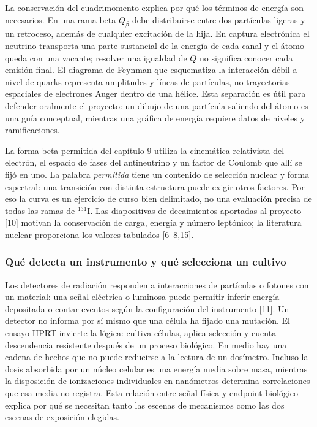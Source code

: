 \documentclass[11pt,a4paper,oneside]{article}
\begin{document}
La conservación del cuadrimomento explica por qué los términos de
energía son necesarios. En una rama beta $Q_\beta$ debe distribuirse
entre dos partículas ligeras y un retroceso, además de cualquier
excitación de la hija. En captura electrónica el neutrino transporta
una parte sustancial de la energía de cada canal y el átomo queda con
una vacante; resolver una igualdad de $Q$ no significa conocer cada
emisión final. El diagrama de Feynman que esquematiza la interacción
débil a nivel de quarks representa amplitudes y líneas de partículas,
no trayectorias espaciales de electrones Auger dentro de una hélice.
Esta separación es útil para defender oralmente el proyecto: un dibujo
de una partícula saliendo del átomo es una guía conceptual, mientras
una gráfica de energía requiere datos de niveles y ramificaciones.

La forma beta permitida del capítulo 9 utiliza la cinemática relativista
del electrón, el espacio de fases del antineutrino y un factor de Coulomb
que allí se fijó en uno. La palabra \emph{permitida} tiene un contenido
de selección nuclear y forma espectral: una transición con distinta
estructura puede exigir otros factores. Por eso la curva es un ejercicio
de curso bien delimitado, no una evaluación precisa de todas las ramas
de $^{131}$I. Las diapositivas de decaimientos aportadas al proyecto
[10] motivan la conservación de carga, energía y número leptónico; la
literatura nuclear proporciona los valores tabulados [6--8,15].

\subsubsection{Qué detecta un instrumento y qué selecciona un cultivo}
Los detectores de radiación responden a interacciones de partículas o
fotones con un material: una señal eléctrica o luminosa puede permitir
inferir energía depositada o contar eventos según la configuración del
instrumento [11]. Un detector no informa por sí mismo que una célula
ha fijado una mutación. El ensayo HPRT invierte la lógica: cultiva
células, aplica selección y cuenta descendencia resistente después
de un proceso biológico. En medio hay una cadena de hechos que no
puede reducirse a la lectura de un dosímetro. Incluso la dosis absorbida
por un núcleo celular es una energía media sobre masa, mientras la
disposición de ionizaciones individuales en nanómetros determina
correlaciones que esa media no registra. Esta relación entre señal
física y endpoint biológico explica por qué se necesitan tanto las
escenas de mecanismos como las dos escenas de exposición elegidas.
\end{document}
